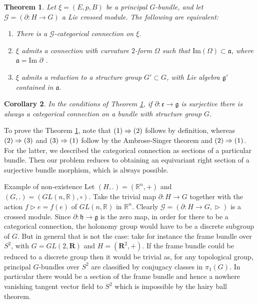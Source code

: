 \documentclass[11pt,a4]{article} %
\newtheorem{theorem}{Theorem}[section]
\newtheorem{corollary}[theorem]{Corollary}%
\begin{document}
\begin{theorem}\label{mainthm}
Let $\xi=(E,p,B)$ be a principal $G$-bundle, and let $\mathcal{G}=(\partial:H\rightarrow G)$ a Lie crossed module. The following are equivalent:
\begin{enumerate}
\item There is a $\mathcal{G}$-categorical connection on $\xi$. \label{1}
\item $\xi$ admits a connection with curvature $2$-form $\Omega$ such that $\text{Im}(\Omega)\subset \mathfrak{a}$, where $\mathfrak{a}=\text{Im }\partial$ .\label{2}
\item $\xi$ admits a reduction to a structure group $G'\subset G$, with Lie algebra $\mathfrak{g}'$ contained in $\mathfrak{a}$. \label{3}
\end{enumerate}
\end{theorem}

\begin{corollary}
 In the conditions of Theorem \ref{mainthm}, if $\partial:\mathfrak{e}\rightarrow \mathfrak{g}$ is surjective there is always a categorical connection on a bundle with structure group $G$.
\end{corollary}

To prove the Theorem \ref{mainthm}, note that $\footnotesize{(1)\Rightarrow (2)}$ follows by definition, whereas $\footnotesize{(2)\Rightarrow (3)}$ and $\footnotesize{(3)\Rightarrow (1)}$ follow by the Ambrose-Singer theorem and $\footnotesize{(2)\Rightarrow (1)}$. For the latter, we described the categorical connection as sections of a particular bundle. Then our problem reduces to obtaining an equivariant right section of a surjective bundle morphism, which is always possible.



\begin{subsection}{Example of non-existence}
 Let $(H,.)=(\mathbb{R}^n,+)$ and $(G,.)=(GL(n,\mathbb{R}),\circ)$. Take the trivial map $\partial:H\rightarrow G$ together with the action $f\vartriangleright e=f(e)$ of $GL(n,\mathbb{R})$ in $\mathbb{R}^n$. Clearly $\mathcal{G}=(\partial:H\rightarrow G,\vartriangleright)$ is a crossed module. Since $\partial:\mathfrak{h}\rightarrow \mathfrak{g}$ is the zero map, in order for there to be a categorical connection, the holonomy group would have to be a discrete subgroup of $G$. But in general that is not the case: take for instance the frame bundle over $S^2$, with $G=GL(2,\mathbf{R})$ and $H=(\mathbf{R}^2,+)$. If the frame bundle could be reduced to a discrete group then it would be trivial as, for any topological group, principal $G$-bundles over $S^2$ are classified by conjugacy classes in $\pi_1(G)$. In particular there would be a section of the frame bundle and hence a nowhere vanishing tangent vector field to $S^2$ which is impossible by the hairy ball theorem.
\end{subsection}
\end{document}
